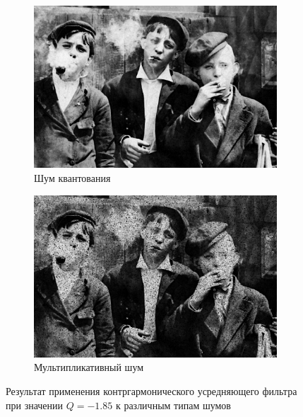 \begin{figure}[ht]
\begin{subfigure}[b]{0.5\linewidth}
      \includegraphics[width=0.95\linewidth]{../Contraharmonic_Filter/Contraharmonic_Poisson_noise_(m,n=(3,_3),q=-1.85).jpg} 
      \caption{Шум квантования} 
      \label{contraharmonic_-1.85:e}
    \end{subfigure}%
    \begin{subfigure}[b]{0.5\linewidth}
        \centering
        \includegraphics[width=0.95\linewidth]{../Contraharmonic_Filter/Contraharmonic_Speckle_noise_(m,n=(3,_3),q=-1.85).jpg} 
        \caption{Мультипликативный шум} 
        \label{contraharmonic_-1.85:f} 
    \end{subfigure} 
    \caption{Результат применения контргармонического усредняющего фильтра при значении $Q = -1.85$ к различным типам шумов}
    \label{img:contraharmonic_-1.85} 
  \end{figure}

